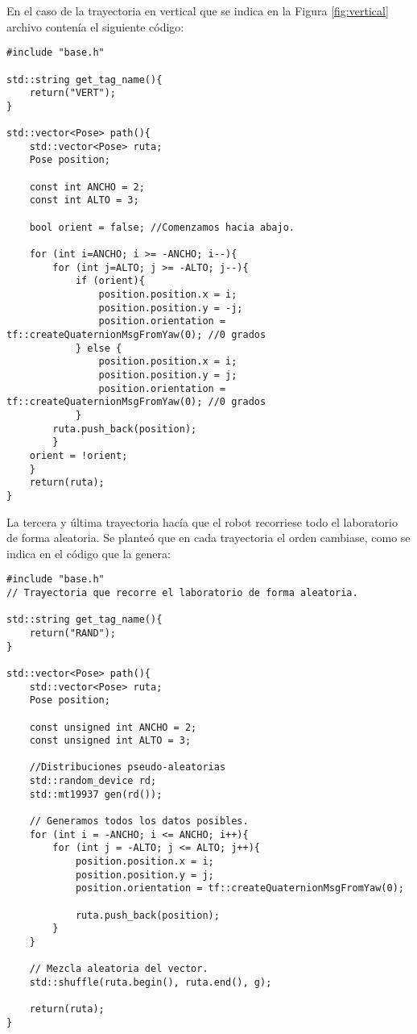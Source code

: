 En el caso de la trayectoria en vertical que se indica en la Figura \ref{fig:vertical} archivo contenía el siguiente código:

\begin{lstlisting}
#include "base.h"

std::string get_tag_name(){
    return("VERT");
}

std::vector<Pose> path(){
    std::vector<Pose> ruta;
    Pose position;

    const int ANCHO = 2;
    const int ALTO = 3;

    bool orient = false; //Comenzamos hacia abajo.

    for (int i=ANCHO; i >= -ANCHO; i--){
        for (int j=ALTO; j >= -ALTO; j--){
            if (orient){
                position.position.x = i;
                position.position.y = -j;
                position.orientation = tf::createQuaternionMsgFromYaw(0); //0 grados
            } else {
                position.position.x = i;
                position.position.y = j;
                position.orientation = tf::createQuaternionMsgFromYaw(0); //0 grados
            }
        ruta.push_back(position);
        }
    orient = !orient;
    }
    return(ruta);
}
\end{lstlisting}
\vspace*{0.5cm}

La tercera y última trayectoria hacía que el robot recorriese todo el laboratorio de forma aleatoria.
Se planteó que en cada trayectoria el orden cambiase, como se indica en el código que la genera:
\begin{lstlisting}
#include "base.h"
// Trayectoria que recorre el laboratorio de forma aleatoria.

std::string get_tag_name(){
    return("RAND");
}

std::vector<Pose> path(){
    std::vector<Pose> ruta;
    Pose position;

    const unsigned int ANCHO = 2;
    const unsigned int ALTO = 3;

    //Distribuciones pseudo-aleatorias
    std::random_device rd;
    std::mt19937 gen(rd());

    // Generamos todos los datos posibles.
    for (int i = -ANCHO; i <= ANCHO; i++){
        for (int j = -ALTO; j <= ALTO; j++){
            position.position.x = i;
            position.position.y = j;
            position.orientation = tf::createQuaternionMsgFromYaw(0);

            ruta.push_back(position);
        }
    }

    // Mezcla aleatoria del vector.
    std::shuffle(ruta.begin(), ruta.end(), g);

    return(ruta);
}    
\end{lstlisting}
\vspace*{0.5cm}

